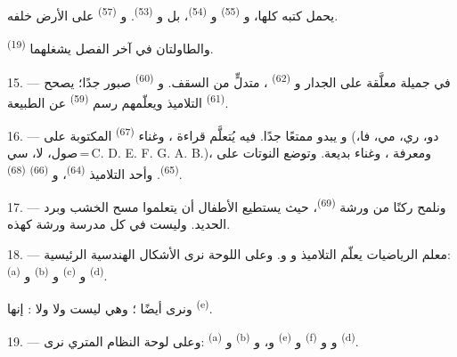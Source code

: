 يحمل كتبه كلها، و \textsuperscript{(55)} و
\textsuperscript{(54)}، بل و \textsuperscript{(53)}. و
\textsuperscript{(57)} على الأرض خلفه.

والطاولتان في آخر الفصل يشغلهما  \textsuperscript{(19)}.

\VUsaut{4.6mm}
\VUsaut{3.4mm}

15. --- في   جميلة معلَّقة على الجدار
و \textsuperscript{(62)} ، متدلٍّ من السقف.
و \textsuperscript{(60)} صبور جدًا؛ يصحح 
\textsuperscript{(61)} التلاميذ ويعلّمهم رسم  \textsuperscript{(59)}
عن الطبيعة.

16. --- و يبدو ممتعًا جدًا. فيه يُتعلَّم قراءة
، وغناء  \textsuperscript{(67)} المكتوبة على
 (دو، ري، مي، فا، صول، لا، سي\,=\,C. D. E. F. G. A. B.)،
ومعرفة ، وغناء  بديعة. وتوضع النوتات على
 \textsuperscript{(65)}. وأحد التلاميذ 
\textsuperscript{(64)}، و \textsuperscript{(66)}
 \textsuperscript{(68)}.

17. --- ونلمح ركنًا من ورشة  \textsuperscript{(69)}،
حيث يستطيع الأطفال أن يتعلموا مسح الخشب وبرد الحديد. وليست في كل مدرسة
ورشة كهذه.

\VUsaut{5.0mm}
\VUsaut{3.6mm}

18. --- معلم الرياضيات يعلّم التلاميذ 
و و. وعلى اللوحة نرى الأشكال
الهندسية الرئيسية:  \textsuperscript{(a)} و
\textsuperscript{(b)} و \textsuperscript{(c)} و
\textsuperscript{(d)}.

ونرى أيضًا ؛ وهي ليست  ولا  ولا
: إنها  \textsuperscript{(e)}.

19. --- وعلى لوحة النظام المتري نرى:  \textsuperscript{(a)}
و \textsuperscript{(b)} و، و
\textsuperscript{(e)} و \textsuperscript{(f)} و
و \textsuperscript{(d)}.

